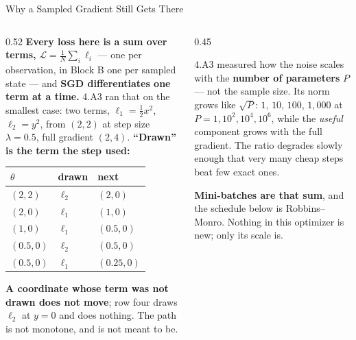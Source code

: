 \begin{frame}{Why a Sampled Gradient Still Gets There}
\begin{columns}[T]
\begin{column}{0.52\textwidth}
\small
\textbf{Every loss here is a sum over terms,} $\mathcal{L}=\frac1N\sum_i\ell_i$ --- one per observation, in Block B one per sampled state --- and \textbf{SGD differentiates one term at a time.} 4.A3 ran that on the smallest case: two terms, $\ell_1=\tfrac12x^2$, $\ell_2=y^2$, from $(2,2)$ at step size $\lambda=0.5$, full gradient $(2,4)$. \textbf{``Drawn'' is the term the step used:}
\medskip

\begin{center}\footnotesize
\begin{tabularx}{\linewidth}{@{}>{\raggedright\arraybackslash}p{1.6cm} >{\raggedright\arraybackslash}p{1.0cm} >{\raggedright\arraybackslash}X@{}}
\toprule
$\theta$ & \textbf{drawn} & \textbf{next} \\
\midrule
$(2,2)$ & $\ell_2$ & $(2,0)$ \\
$(2,0)$ & $\ell_1$ & $(1,0)$ \\
$(1,0)$ & $\ell_1$ & $(0.5,0)$ \\
$(0.5,0)$ & $\ell_2$ & $(0.5,0)$ \\
$(0.5,0)$ & $\ell_1$ & $(0.25,0)$ \\
\bottomrule
\end{tabularx}
\end{center}
\vspace{-2mm}
{\footnotesize \textbf{A coordinate whose term was not drawn does not move}; row four draws $\ell_2$ at $y=0$ and does nothing. The path is not monotone, and is not meant to be.}
\end{column}
\begin{column}{0.45\textwidth}
\begin{cautionbox}[title=\textbf{And why it still works}]\footnotesize
4.A3 measured how the noise scales with the \textbf{number of parameters} $P$ --- not the sample size. Its norm grows like $\sqrt P$: $1$, $10$, $100$, $1{,}000$ at $P=1,10^{2},10^{4},10^{6}$, while the \emph{useful} component grows with the full gradient. The ratio degrades slowly enough that very many cheap steps beat few exact ones.
\end{cautionbox}
\medskip
{\footnotesize \textbf{Mini-batches are that sum}, and the schedule below is Robbins--Monro. Nothing in this optimizer is new; only its scale is.}
\end{column}
\end{columns}
\vspace{1mm}
\end{frame}

